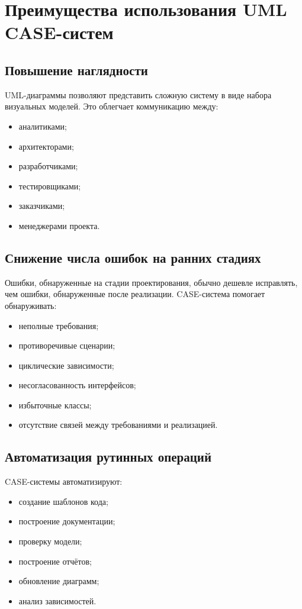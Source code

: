 \documentclass[12pt,a4paper]{article}
\begin{document}
\section{Преимущества использования UML CASE-систем}

\subsection{Повышение наглядности}

UML-диаграммы позволяют представить сложную систему в виде набора визуальных моделей. Это облегчает коммуникацию между:
\begin{itemize}
    \item аналитиками;
    \item архитекторами;
    \item разработчиками;
    \item тестировщиками;
    \item заказчиками;
    \item менеджерами проекта.
\end{itemize}

\subsection{Снижение числа ошибок на ранних стадиях}

Ошибки, обнаруженные на стадии проектирования, обычно дешевле исправлять, чем ошибки, обнаруженные после реализации. CASE-система помогает обнаруживать:
\begin{itemize}
    \item неполные требования;
    \item противоречивые сценарии;
    \item циклические зависимости;
    \item несогласованность интерфейсов;
    \item избыточные классы;
    \item отсутствие связей между требованиями и реализацией.
\end{itemize}

\subsection{Автоматизация рутинных операций}

CASE-системы автоматизируют:
\begin{itemize}
    \item создание шаблонов кода;
    \item построение документации;
    \item проверку модели;
    \item построение отчётов;
    \item обновление диаграмм;
    \item анализ зависимостей.
\end{itemize}
\end{document}

